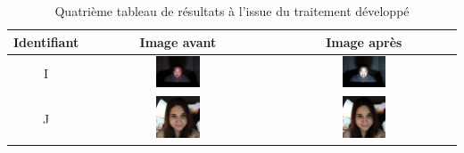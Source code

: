 \documentclass[11pt, french]{report-rd-info}
\begin{document}
\begin{table}
\centering
\begin{tabular}{|c|c|c|}	
   \hline \textbf{Identifiant}  &  \textbf{Image avant}  &  \textbf{Image après} \\ \hline 
   I & \includegraphics[width=0.25\textwidth]{Resultats/pi_avant} & \includegraphics[width=0.25\textwidth]{Resultats/pi_apres} \\ \hline
   J & \includegraphics[width=0.25\textwidth]{Resultats/pj_avant} & \includegraphics[width=0.25\textwidth]{Resultats/pj_apres} \\ \hline   
\end{tabular}
\caption{Quatrième tableau de résultats à l'issue du traitement développé}
\label{tab:Resultats4}
\end{table}
\end{document}
